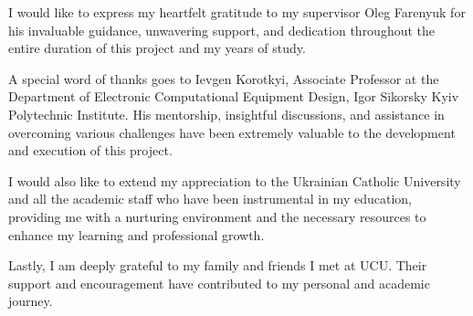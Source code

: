 \documentclass[
11pt, %
oneside, %
english, %
singlespacing, %
headsepline, %
]{BachelorMasterThesis} %
\begin{document}
\begin{acknowledgements}
\addchaptertocentry{\acknowledgementname} %
I would like to express my heartfelt gratitude to my supervisor Oleg Farenyuk for his invaluable guidance, unwavering support, and dedication throughout the entire duration of this project and my years of study.

A special word of thanks goes to Ievgen Korotkyi, Associate Professor at the Department of Electronic Computational Equipment Design, Igor Sikorsky Kyiv Polytechnic Institute. His mentorship, insightful discussions, and assistance in overcoming various challenges have been extremely valuable to the development and execution of this project.

I would also like to extend my appreciation to the Ukrainian Catholic University and all the academic staff who have been instrumental in my education, providing me with a nurturing environment and the necessary resources to enhance my learning and professional growth.

Lastly, I am deeply grateful to my family and friends I met at UCU. Their support and encouragement have contributed to my personal and academic journey.

\end{acknowledgements}


\tableofcontents %

\listoffigures %

\listoftables %

\end{document}
